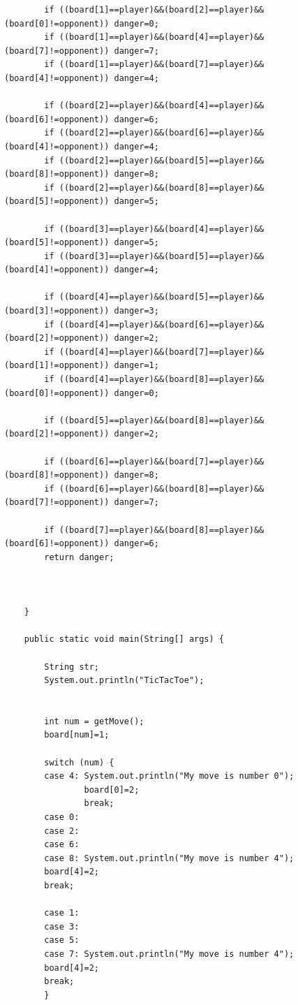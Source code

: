 \begin{lstlisting}
        if ((board[1]==player)&&(board[2]==player)&&(board[0]!=opponent)) danger=0;
        if ((board[1]==player)&&(board[4]==player)&&(board[7]!=opponent)) danger=7;     
        if ((board[1]==player)&&(board[7]==player)&&(board[4]!=opponent)) danger=4;
          
        if ((board[2]==player)&&(board[4]==player)&&(board[6]!=opponent)) danger=6;
        if ((board[2]==player)&&(board[6]==player)&&(board[4]!=opponent)) danger=4;     
        if ((board[2]==player)&&(board[5]==player)&&(board[8]!=opponent)) danger=8;
        if ((board[2]==player)&&(board[8]==player)&&(board[5]!=opponent)) danger=5;
  
        if ((board[3]==player)&&(board[4]==player)&&(board[5]!=opponent)) danger=5;
        if ((board[3]==player)&&(board[5]==player)&&(board[4]!=opponent)) danger=4;     
  
        if ((board[4]==player)&&(board[5]==player)&&(board[3]!=opponent)) danger=3;
        if ((board[4]==player)&&(board[6]==player)&&(board[2]!=opponent)) danger=2;     
        if ((board[4]==player)&&(board[7]==player)&&(board[1]!=opponent)) danger=1;
        if ((board[4]==player)&&(board[8]==player)&&(board[0]!=opponent)) danger=0;
  
        if ((board[5]==player)&&(board[8]==player)&&(board[2]!=opponent)) danger=2;
          
        if ((board[6]==player)&&(board[7]==player)&&(board[8]!=opponent)) danger=8;     
        if ((board[6]==player)&&(board[8]==player)&&(board[7]!=opponent)) danger=7;
          
        if ((board[7]==player)&&(board[8]==player)&&(board[6]!=opponent)) danger=6;
        return danger;
  
  
          
    }
      
    public static void main(String[] args) {
          
        String str;
        System.out.println("TicTacToe");
          
  
        int num = getMove();
        board[num]=1;
          
        switch (num) {
        case 4: System.out.println("My move is number 0");
                board[0]=2;
                break;
        case 0:
        case 2:
        case 6:
        case 8: System.out.println("My move is number 4");
        board[4]=2;
        break;
          
        case 1:
        case 3:
        case 5:
        case 7: System.out.println("My move is number 4");
        board[4]=2;
        break;
        }
          

\end{lstlisting}
